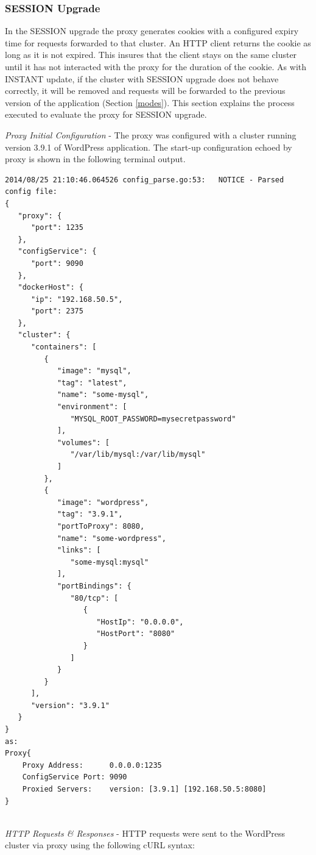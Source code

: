 \documentclass[a4paper,11pt,twoside]{report}
\begin{document}
\subsubsection*{SESSION Upgrade}
In the SESSION upgrade the proxy generates cookies with a configured expiry time for requests forwarded to that cluster. An HTTP client returns the cookie as long as it is not expired. This insures that the client stays on the same cluster until it has not interacted with the proxy for the duration of the cookie. As with INSTANT update, if the cluster with SESSION upgrade does not behave correctly, it will be removed and requests will be forwarded to the previous version of the application (Section \ref{modes}). This section explains the process executed to evaluate the proxy for SESSION upgrade.\medskip

\noindent
\textit{Proxy Initial Configuration} - The proxy was configured with a cluster running version 3.9.1 of WordPress application. The start-up configuration echoed by proxy is shown in the following terminal output.\smallskip

\begin{lstlisting}[language=terminal]
2014/08/25 21:10:46.064526 config_parse.go:53:   NOTICE - Parsed config file:
{
   "proxy": {
      "port": 1235
   },
   "configService": {
      "port": 9090
   },
   "dockerHost": {
      "ip": "192.168.50.5",
      "port": 2375
   },
   "cluster": {
      "containers": [
         {
            "image": "mysql",
            "tag": "latest",
            "name": "some-mysql",
            "environment": [
               "MYSQL_ROOT_PASSWORD=mysecretpassword"
            ],
            "volumes": [
               "/var/lib/mysql:/var/lib/mysql"
            ]
         },
         {
            "image": "wordpress",
            "tag": "3.9.1",
            "portToProxy": 8080,
            "name": "some-wordpress",
            "links": [
               "some-mysql:mysql"
            ],
            "portBindings": {
               "80/tcp": [
                  {
                     "HostIp": "0.0.0.0",
                     "HostPort": "8080"
                  }
               ]
            }
         }
      ],
      "version": "3.9.1"
   }
}
as:
Proxy{
	Proxy Address:      0.0.0.0:1235
	ConfigService Port: 9090
	Proxied Servers:    version: [3.9.1] [192.168.50.5:8080]
}
\end{lstlisting}

\noindent \\
\textit{HTTP Requests \& Responses} - HTTP requests were sent to the WordPress cluster via proxy using the following cURL syntax:\smallskip  
\end{document}
